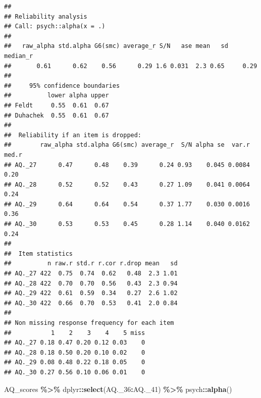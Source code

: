 \documentclass[
]{article}
\newenvironment{Shaded}{\begin{snugshade}}{\end{snugshade}}
\newcommand{\FunctionTok}[1]{\textcolor[rgb]{0.13,0.29,0.53}{\textbf{#1}}}
\newcommand{\NormalTok}[1]{#1}
\newcommand{\SpecialCharTok}[1]{\textcolor[rgb]{0.81,0.36,0.00}{\textbf{#1}}}
\begin{document}
\begin{verbatim}
## 
## Reliability analysis   
## Call: psych::alpha(x = .)
## 
##   raw_alpha std.alpha G6(smc) average_r S/N   ase mean   sd median_r
##       0.61      0.62    0.56      0.29 1.6 0.031  2.3 0.65     0.29
## 
##     95% confidence boundaries 
##          lower alpha upper
## Feldt     0.55  0.61  0.67
## Duhachek  0.55  0.61  0.67
## 
##  Reliability if an item is dropped:
##        raw_alpha std.alpha G6(smc) average_r  S/N alpha se  var.r med.r
## AQ._27      0.47      0.48    0.39      0.24 0.93    0.045 0.0084  0.20
## AQ._28      0.52      0.52    0.43      0.27 1.09    0.041 0.0064  0.24
## AQ._29      0.64      0.64    0.54      0.37 1.77    0.030 0.0016  0.36
## AQ._30      0.53      0.53    0.45      0.28 1.14    0.040 0.0162  0.24
## 
##  Item statistics 
##          n raw.r std.r r.cor r.drop mean   sd
## AQ._27 422  0.75  0.74  0.62   0.48  2.3 1.01
## AQ._28 422  0.70  0.70  0.56   0.43  2.3 0.94
## AQ._29 422  0.61  0.59  0.34   0.27  2.6 1.02
## AQ._30 422  0.66  0.70  0.53   0.41  2.0 0.84
## 
## Non missing response frequency for each item
##           1    2    3    4    5 miss
## AQ._27 0.18 0.47 0.20 0.12 0.03    0
## AQ._28 0.18 0.50 0.20 0.10 0.02    0
## AQ._29 0.08 0.48 0.22 0.18 0.05    0
## AQ._30 0.27 0.56 0.10 0.06 0.01    0
\end{verbatim}

\begin{Shaded}
\begin{Highlighting}[]
\NormalTok{AQ\_scores }\SpecialCharTok{\%\textgreater{}\%}\NormalTok{ dplyr}\SpecialCharTok{::}\FunctionTok{select}\NormalTok{(AQ.\_36}\SpecialCharTok{:}\NormalTok{AQ.\_41) }\SpecialCharTok{\%\textgreater{}\%}\NormalTok{ psych}\SpecialCharTok{::}\FunctionTok{alpha}\NormalTok{()}
\end{Highlighting}
\end{Shaded}
\end{document}
